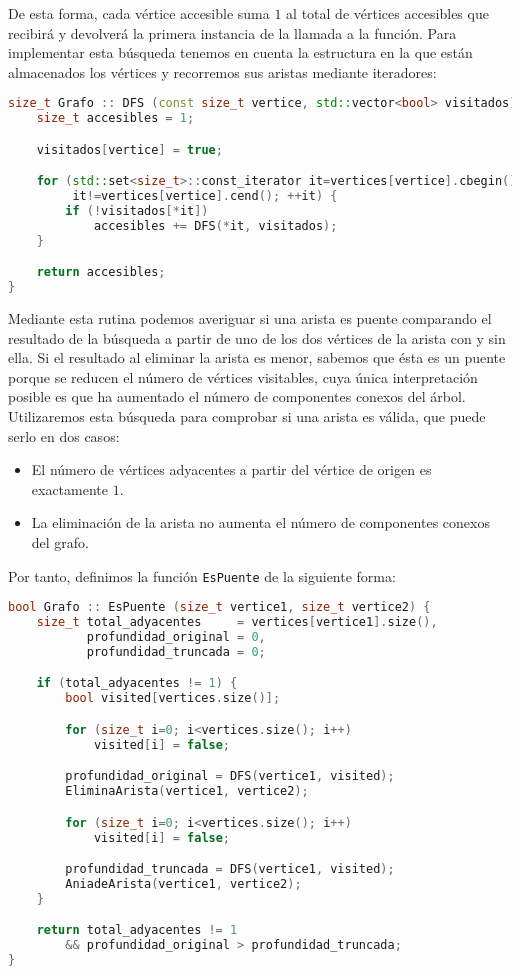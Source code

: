 De esta forma, cada vértice accesible suma $1$ al total de vértices accesibles que recibirá y devolverá la primera instancia de la llamada a la función.
Para implementar esta búsqueda tenemos en cuenta la estructura en la que están almacenados los vértices y recorremos sus aristas mediante iteradores:

\begin{lstlisting}[language=C++]
size_t Grafo :: DFS (const size_t vertice, std::vector<bool> visitados) {
	size_t accesibles = 1;

	visitados[vertice] = true;

	for (std::set<size_t>::const_iterator it=vertices[vertice].cbegin();
	     it!=vertices[vertice].cend(); ++it) {
		if (!visitados[*it])
			accesibles += DFS(*it, visitados);
	}

	return accesibles;
}
\end{lstlisting}

Mediante esta rutina podemos averiguar si una arista es puente comparando el resultado de la búsqueda a partir de uno de los dos vértices de la arista con y sin ella.
Si el resultado al eliminar la arista es menor, sabemos que ésta es un puente porque se reducen el número de vértices visitables, cuya única interpretación posible es que ha aumentado el número de componentes conexos del árbol.
Utilizaremos esta búsqueda para comprobar si una arista es válida, que puede serlo en dos casos:

\begin{itemize}
	\item El número de vértices adyacentes a partir del vértice de origen es exactamente $1$.
	\item La eliminación de la arista no aumenta el número de componentes conexos del grafo.
\end{itemize}

Por tanto, definimos la función \texttt{EsPuente} de la siguiente forma:

\begin{lstlisting}[language=C++]
bool Grafo :: EsPuente (size_t vertice1, size_t vertice2) {
	size_t total_adyacentes     = vertices[vertice1].size(),
	       profundidad_original = 0,
	       profundidad_truncada = 0;

	if (total_adyacentes != 1) {
		bool visited[vertices.size()];

		for (size_t i=0; i<vertices.size(); i++)
			visited[i] = false;

		profundidad_original = DFS(vertice1, visited);
		EliminaArista(vertice1, vertice2);

		for (size_t i=0; i<vertices.size(); i++)
			visited[i] = false;

		profundidad_truncada = DFS(vertice1, visited);
		AniadeArista(vertice1, vertice2);
	}

	return total_adyacentes != 1
	    && profundidad_original > profundidad_truncada;
}
\end{lstlisting}

